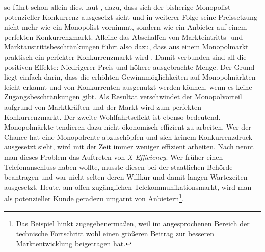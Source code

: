 so führt schon allein dies, laut \textcite{Baumol1982}, dazu, dass sich der bisherige Monopolist potenzieller Konkurrenz ausgesetzt sieht und in weiterer Folge seine Preissetzung nicht mehr wie ein Monopolist vornimmt, sondern wie ein Anbieter auf einem perfekten Konkurrenzmarkt. Alleine das Abschaffen von Markteintritts- und Marktaustrittsbeschränkungen führt also dazu, dass aus einem Monopolmarkt praktisch ein perfekter Konkurrenzmarkt wird \parencite[S. 2]{Baumol1982b}. Damit verbunden sind all die positiven Effekte: Niedrigerer Preis und höhere ausgebrachte Menge. Der Grund liegt einfach darin, dass die erhöhten Gewinnmöglichkeiten auf Monopolmärkten leicht erkannt und von Konkurrenten ausgenutzt werden können, wenn es keine Zugangsbeschränkungen gibt. Als Resultat verschwindet der Monopolvorteil aufgrund von Marktkräften und der Markt wird zum perfekten Konkurrenzmarkt. Der zweite Wohlfahrtseffekt ist ebenso bedeutend. Monopolmärkte tendieren dazu nicht ökonomisch effizient zu arbeiten. Wer der Chance hat eine Monopolrente abzuschöpfen und sich keinem Konkurrenzdruck ausgesetzt sieht, wird mit der Zeit immer weniger effizient arbeiten. Nach \textcite{Leibenstein1966} nennt man dieses Problem das Auftreten von \textit{X-Efficiency}. Wer früher einen Telefonanschluss haben wollte, musste diesen bei der staatlichen Behörde beantragen und war nicht selten deren Willkür und damit langen Wartezeiten ausgesetzt. Heute, am offen zugänglichen Telekommunikationsmarkt, wird man als potenzieller Kunde geradezu umgarnt von Anbietern\footnote{Das Beispiel hinkt zugegebenermaßen, weil im angesprochenen Bereich der technische Fortschritt wohl einen größeren Beitrag zur besseren Marktentwicklung beigetragen hat.}. 
